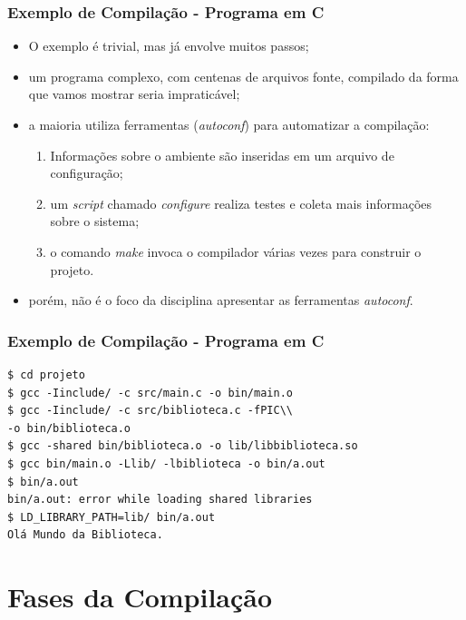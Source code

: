 \documentclass[table]{beamer}
\begin{document}
\begin{frame}
   \frametitle{Exemplo de Compilação - Programa em C}
   \begin{itemize}
      \item O exemplo é trivial, mas já envolve muitos passos;
      \item um programa complexo, com centenas de arquivos fonte, compilado da forma que vamos mostrar seria impraticável;
      \item a maioria utiliza ferramentas (\textit{autoconf}) para automatizar a compilação:
      \begin{enumerate}
         \item Informações sobre o ambiente são inseridas em um arquivo de configuração;
	 \item um \textit{script} chamado \textit{configure} realiza testes e coleta mais informações sobre o sistema;
	 \item o comando \textit{make} invoca o compilador várias vezes para construir o projeto.
      \end{enumerate}
      \item porém, não é o foco da disciplina apresentar as ferramentas \textit{autoconf}.
   \end{itemize}
\end{frame}

\begin{frame}[fragile]
   \frametitle{Exemplo de Compilação - Programa em C}
   \begin{verbatim}
$ cd projeto
$ gcc -Iinclude/ -c src/main.c -o bin/main.o
$ gcc -Iinclude/ -c src/biblioteca.c -fPIC\\
-o bin/biblioteca.o
$ gcc -shared bin/biblioteca.o -o lib/libbiblioteca.so
$ gcc bin/main.o -Llib/ -lbiblioteca -o bin/a.out
$ bin/a.out
bin/a.out: error while loading shared libraries
$ LD_LIBRARY_PATH=lib/ bin/a.out 
Olá Mundo da Biblioteca.
   \end{verbatim}
\end{frame}

\section{Fases da Compilação}
\end{document}
